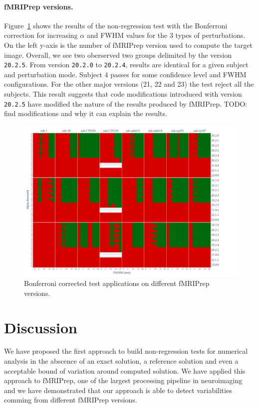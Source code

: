 \documentclass{article}
\newcommand{\TODO}[1]{\color{red}\textsc{TODO:} #1\color{black}\xspace}
\newcommand{\fmriprep}{fMRIPrep\xspace}
\begin{document}
\paragraph*{\fmriprep versions.} Figure~\ref{fig:version_bonferroni} shows the results of the non-regression test
with the Bonferroni correction for increasing $\alpha$ and FWHM values for the 3 types of perturbations.
On the left y-axis is the number of \fmriprep version used to compute the target image.
Overall, we see two oberserved two groups delimited by the version \texttt{20.2.5}.
From version \texttt{20.2.0} to \texttt{20.2.4}, results are identical for a given subject and perturbation mode.
Subject 4 passes for some confidence level and FWHM configurations. For the other major versions (21, 22 and 23)
the test reject all the subjects. This result suggests that code modifications introduced with version \texttt{20.2.5}
have modified the nature of the results produced by \fmriprep.
\TODO{find modifications and why it can explain the results}.

\begin{figure}
    \centering
    \includegraphics[width=\linewidth]{figures/fmriprep-versions/bonferroni.pdf}
    \caption{Bonferroni corrected test applications on different \fmriprep versions.}
    \label{fig:version_bonferroni}
\end{figure}


\section{Discussion}

We have proposed the first approach to build non-regression tests for numerical analysis
in the abscence of an exact solution, a reference solution and even a acceptable bound of variation around computed solution.
We have applied this approach to \fmriprep, one of the largest processing pipeline in neuroimaging and we have
demonstrated that our approach is able to detect variabilities comming from different \fmriprep versions.
\end{document}
